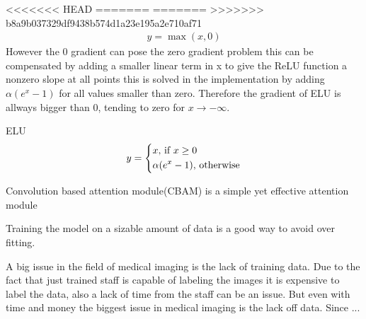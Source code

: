 \documentclass[
a4paper, 
12pt,
grayscalebody, %
abstract=on,
twoside, BCOR10mm, 12pt, DIV13,headinclude, footexclude, final, abstracton, openright
]{ibireprt}
\numberwithin{equation}{chapter}
\numberwithin{table}{chapter}
\numberwithin{figure}{chapter}
\numberwithin{algorithm}{chapter}
\numberwithin{example}{chapter}
\numberwithin{example}{chapter}
\begin{document}
<<<<<<< HEAD
=======
=======
>>>>>>> b8a9b037329df9438b574d1a23e195a2e710af71
\begin{align}
	y = \max(x,0)
\end{align}
However the 0 gradient can pose the zero gradient problem this can be compensated by adding a smaller linear term in x to give the ReLU function a nonzero slope at all points this is solved in the implementation by adding $\alpha(e^x-1)$ for all values smaller than zero. Therefore the gradient of ELU is allways bigger than 0, tending to zero for $x \rightarrow - \infty$.

ELU
\begin{align}
	y = 
	\begin{dcases}
		x \text{, if } x \geq 0 \\
		\alpha(e^x-1) \text{, otherwise}
	\end{dcases}
\end{align}


Convolution based attention module(CBAM) is a simple yet effective attention module \cite{Woo2018}



Training the model on a sizable amount of data is a good way to avoid over fitting. 

A big issue in the field of medical imaging is the lack of training data. Due to the fact that just trained staff is capable of labeling the images it is expensive to label the data, also a lack of time from the staff can be an issue. But even with time and money the biggest issue in medical imaging is the lack off data. Since ... %
\end{document}
